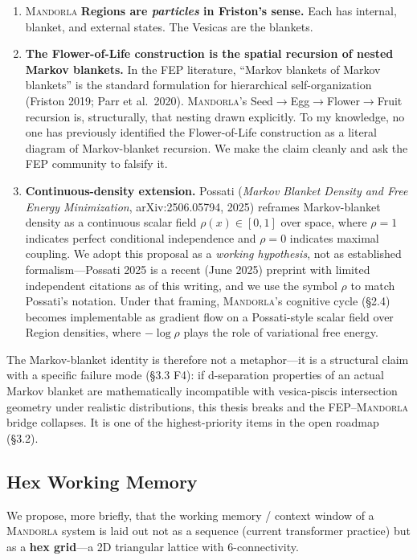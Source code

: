 \documentclass[11pt,a4paper]{article}
\begin{document}
\begin{enumerate}[leftmargin=*]
  \item \textsc{Mandorla} \textbf{Regions are \emph{particles} in Friston's sense.} Each has internal, blanket, and external states. The Vesicas are the blankets.
  \item \textbf{The Flower-of-Life construction is the spatial recursion of nested Markov blankets.} In the FEP literature, ``Markov blankets of Markov blankets'' is the standard formulation for hierarchical self-organization (Friston 2019; Parr et al.\ 2020). \textsc{Mandorla}'s Seed$\rightarrow$Egg$\rightarrow$Flower$\rightarrow$Fruit recursion is, structurally, that nesting drawn explicitly. To my knowledge, no one has previously identified the Flower-of-Life construction as a literal diagram of Markov-blanket recursion. We make the claim cleanly and ask the FEP community to falsify it.
  \item \textbf{Continuous-density extension.} Possati (\emph{Markov Blanket Density and Free Energy Minimization}, arXiv:2506.05794, 2025) reframes Markov-blanket density as a continuous scalar field $\rho(x) \in [0, 1]$ over space, where $\rho = 1$ indicates perfect conditional independence and $\rho = 0$ indicates maximal coupling. We adopt this proposal as a \emph{working hypothesis}, not as established formalism---Possati 2025 is a recent (June 2025) preprint with limited independent citations as of this writing, and we use the symbol $\rho$ to match Possati's notation. Under that framing, \textsc{Mandorla}'s cognitive cycle (\S 2.4) becomes implementable as gradient flow on a Possati-style scalar field over Region densities, where $-\log \rho$ plays the role of variational free energy.
\end{enumerate}

The Markov-blanket identity is therefore not a metaphor---it is a structural claim with a specific failure mode (\S 3.3 F4): if d-separation properties of an actual Markov blanket are mathematically incompatible with vesica-piscis intersection geometry under realistic distributions, this thesis breaks and the FEP--\textsc{Mandorla} bridge collapses. It is one of the highest-priority items in the open roadmap (\S 3.2).

\subsection{Hex Working Memory}

We propose, more briefly, that the working memory / context window of a \textsc{Mandorla} system is laid out not as a sequence (current transformer practice) but as a \textbf{hex grid}---a 2D triangular lattice with 6-connectivity.
\end{document}
